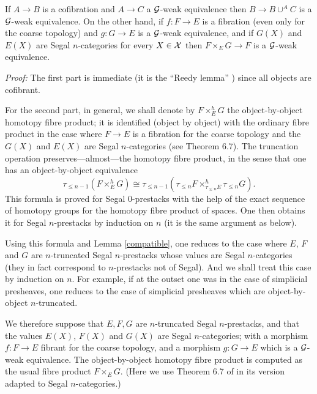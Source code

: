 \begin{lemma}
\label{proper}
If $A\rightarrow B$ is a cofibration and $A\rightarrow C$ a
${\cal G}$-weak equivalence then $B\rightarrow B\cup ^AC$ is a
${\cal G}$-weak
equivalence. On the other hand, if $f:F\rightarrow E$ is a fibration (even only
for the coarse topology) and $g:G\rightarrow E$ is a ${\cal G}$-weak
equivalence, and if $G(X)$ and $E(X)$ are Segal $n$-categories for every
$X\in
{\cal X}$ then $F\times _EG\rightarrow F$ is a ${\cal G}$-weak equivalence.
\end{lemma}
{\em Proof:}
The first part is immediate (it is the ``Reedy lemma''
\cite{Reedy} \cite{DHK} \cite{Hirschhorn}) since all objects are cofibrant.

For the second part, in general, we shall denote by
$F\times ^h_EG$ the object-by-object homotopy fibre product; it
is identified (object by object)
with the ordinary fibre product in the case where
$F\rightarrow E$ is a fibration for the
coarse topology and the $G(X)$ and $E(X)$ are Segal $n$-categories (see
\cite{nCAT} Theorem 6.7).
The truncation operation preserves---almost---the
homotopy fibre product, in the sense that one has an object-by-object
equivalence
$$
\tau _{\leq n-1} (F\times ^h _EG) \cong
\tau _{\leq n-1}\left( \tau _{\leq n}F\times ^h _{\tau _{\leq n}E}\tau
_{\leq n}G
\right) .
$$
This formula is proved for Segal $0$-prestacks
with the help of the exact sequence
of homotopy groups for the homotopy fibre product of spaces. One
then obtains it for Segal $n$-prestacks by induction on
$n$ (it is the
same argument as below).


Using this formula and Lemma
\ref{compatible}, one reduces to the case where $E$, $F$
and $G$ are $n$-truncated Segal $n$-prestacks whose values
are
Segal $n$-categories (they in fact correspond to $n$-prestacks not of
Segal). And we shall treat this case by induction on $n$. For example, if at the
outset one was in the case of simplicial presheaves, one reduces to the
case of simplicial presheaves which are object-by-object $n$-truncated.


We therefore suppose that $E,F,G$ are $n$-truncated Segal $n$-prestacks,
and that the values $E(X)$, $F(X)$ and $G(X)$ are Segal $n$-categories;
with a morphism $f: F\rightarrow E$ fibrant for the coarse topology,
and a morphism $g: G\rightarrow E$ which is a ${\cal G}$-weak equivalence.
The object-by-object homotopy fibre product is computed as the usual fibre
product $F\times _EG$. (Here we use Theorem 6.7 of
\cite{nCAT}
in its version adapted to Segal $n$-categories.)

